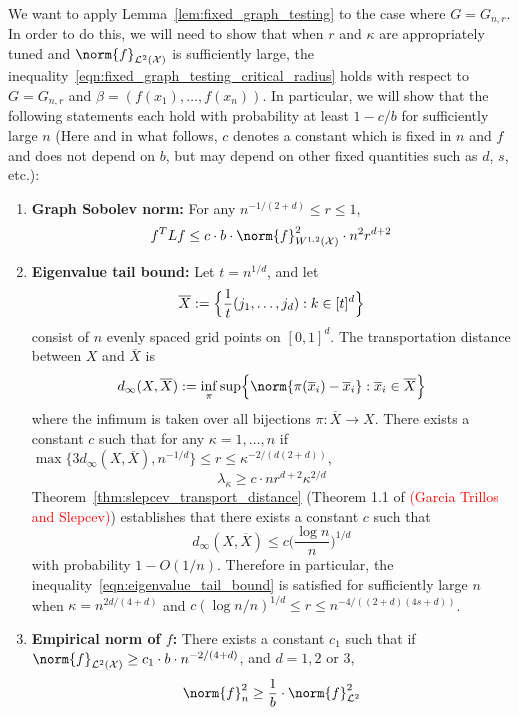 \documentclass{article}
\newcommand{\1}{\mathbf{1}}
\newcommand{\Xset}{\mathcal{X}}
\newcommand{\Leb}{\mathcal{L}}
\newcommand{\ol}[1]{\overline{#1}}
\theoremstyle{alden}
\theoremstyle{aldenthm}
\theoremstyle{definition}
\theoremstyle{remark}
\begin{document}
We want to apply Lemma~\ref{lem:fixed_graph_testing} to the case where $G = G_{n,r}$. In order to do this, we will need to show that when $r$ and $\kappa$ are appropriately tuned and $\norm{f}_{\Leb^2(\mathcal{X})}$ is sufficiently large, the inequality~\eqref{eqn:fixed_graph_testing_critical_radius} holds with respect to $G = G_{n,r}$ and $\beta = (f(x_1),\ldots,f(x_n))$. In particular, we will show that the following statements each hold with probability at least $1 - c/b$ for sufficiently large $n$ (Here and in what follows, $c$ denotes a constant which is fixed in $n$ and $f$ and does not depend on $b$, but may depend on other fixed quantities such as $d$, $s$, etc.): 
\begin{enumerate}[label=(E\arabic*)]
	\item 
	\label{event:discrete_sobolev_norm_order1}
	\textbf{Graph Sobolev norm:} For any $n^{-1/(2 + d)}\leq r \leq 1$,
	\begin{equation}
	\label{eqn:continuous_to_discrete_sobolev_norm_order1}
	f^T L f \leq c \cdot b \cdot \norm{f}_{W^{1,2}(\Xset)}^2 \cdot n^{2} r^{d + 2} 
	\end{equation}
	\item 
	\label{event:eigenvalue_tail_decay}
	\textbf{Eigenvalue tail bound:} Let $t = n^{1/d}$, and let
	\begin{equation*}
	\overline{X} := \Bigl\{\frac{1}{t}(j_1,\ldots,j_d): k \in [t]^d\Bigr\}
	\end{equation*} 
	consist of $n$ evenly spaced grid points on $[0,1]^d$. The transportation distance between $X$ and $\ol{X}$ is
	\begin{equation*}
	d_{\infty}(X,\overline{X}) := \inf_{\pi} \sup\Bigl\{\norm{\pi(\ol{x}_i) - \ol{x}_i}: \ol{x}_i \in \ol{X}\Bigr\}
	\end{equation*}
	where the infimum is taken over all bijections $\pi: \ol{X} \to X$. 
	There exists a constant $c$ such that for any $\kappa = 1,\ldots,n$ if $\max\{ 3 d_{\infty}(X,\ol{X}),n^{-1/d}\} \leq r \leq \kappa^{-2/(d(2 +d))}$, 
	\begin{equation}
	\label{eqn:eigenvalue_tail_bound}
	\lambda_{\kappa} \geq c \cdot n r^{d + 2} \kappa^{2/d}
	\end{equation}
	Theorem~\ref{thm:slepcev_transport_distance} (Theorem 1.1 of \textcolor{red}{(Garcia Trillos and Slepcev)}) establishes that there exists a constant $c$ such that 
	\begin{equation*}
	d_{\infty}(X,\ol{X}) \leq c\biggl(\frac{\log n}{n}\biggr)^{1/d}
	\end{equation*}
	with probability $1  - O(1/n)$. Therefore in particular, the inequality~\eqref{eqn:eigenvalue_tail_bound} is satisfied for sufficiently large $n$ when $\kappa = n^{2d/(4 + d)}$ and $c(\log n/n)^{1/d} \leq r \leq n^{-4/((2+d)(4s + d))}$. 
	\item 
	\label{event:l2_norm}
	\textbf{Empirical norm of $f$:} There exists a constant $c_1$ such that if $\norm{f}_{\Leb^2(\Xset)} \geq c_1 \cdot b \cdot n^{-2/(4 + d)}$, and $d = 1,2$ or $3$,
	\begin{equation}
	\label{eqn:l2_to_empirical_norm}
	\norm{f}_n^2 \geq \frac{1}{b} \cdot \norm{f}_{\Leb^2}^2
	\end{equation}
\end{enumerate} 
\end{document}
